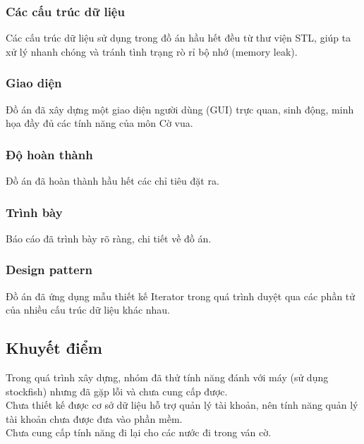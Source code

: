 \subsubsection{Các cấu trúc dữ liệu}
Các cấu trúc dữ liệu sử dụng trong đồ án hầu hết đều từ thư viện STL, giúp ta xử lý nhanh chóng và tránh tình trạng rò rỉ bộ nhớ (memory leak).

\subsubsection{Giao diện}
Đồ án đã xây dựng một giao diện người dùng (GUI) trực quan, sinh động, minh họa đầy đủ các tính năng của môn Cờ vua.

\subsubsection{Độ hoàn thành}
Đồ án đã hoàn thành hầu hết các chỉ tiêu đặt ra.

\subsubsection{Trình bày}
Báo cáo đã trình bày rõ ràng, chi tiết về đồ án.

\subsubsection{Design pattern}
Đồ án đã ứng dụng mẫu thiết kế Iterator trong quá trình duyệt qua các phần tử của nhiều cấu trúc dữ liệu khác nhau.

\subsection{Khuyết điểm}
Trong quá trình xây dựng, nhóm đã thử tính năng đánh với máy (sử dụng stockfish) nhưng đã gặp lỗi và chưa cung cấp được.\\
Chưa thiết kế được cơ sở dữ liệu hỗ trợ quản lý tài khoản, nên tính năng quản lý tài khoản chưa được đưa vào phần mềm.\\
Chưa cung cấp tính năng đi lại cho các nước đi trong ván cờ.